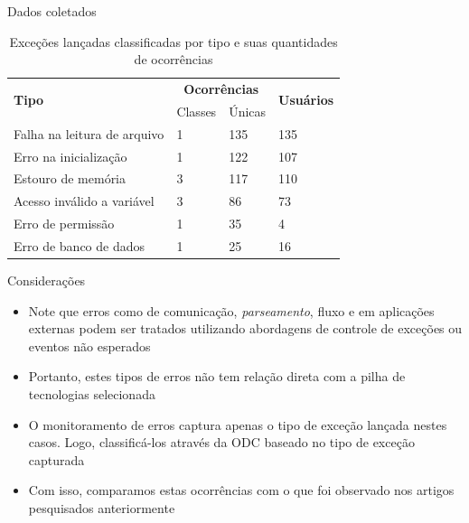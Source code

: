 \documentclass[brazilian]{beamer}
\begin{document}
\begin{frame}{Dados coletados}
    \begin{table}[H]
        \centering
        \begin{tabularx}{\textwidth}{ l|X|l|l }
            \multirow{2}{*}{\textbf{Tipo}} & \multicolumn{2}{c|}{\textbf{Ocorrências}} & \multirow{2}{*}{\textbf{Usuários}} \\
            & Classes & Únicas & \\
            \hline
            Falha na leitura de arquivo & 1 & 135 & 135 \\
            Erro na inicialização & 1 & 122 & 107 \\
            Estouro de memória & 3 & 117 & 110 \\
            Acesso inválido a variável & 3 & 86 & 73 \\
            Erro de permissão & 1 & 35 & 4 \\
            Erro de banco de dados & 1 & 25 & 16 \\
        \end{tabularx}
        \caption{Exceções lançadas classificadas por tipo e suas quantidades de ocorrências}
        \label{table:exceptions_classification_2}
    \end{table}
\end{frame}

\begin{frame}{Considerações}
    \begin{itemize}
        \item Note que erros como de comunicação, \textit{parseamento}, fluxo e em aplicações externas podem ser tratados utilizando abordagens de controle de exceções ou eventos não esperados
        \item Portanto, estes tipos de erros não tem relação direta com a pilha de tecnologias selecionada
        \item O monitoramento de erros captura apenas o tipo de exceção lançada nestes casos. Logo, classificá-los através da ODC baseado no tipo de exceção capturada
        \item Com isso, comparamos estas ocorrências com o que foi observado nos artigos pesquisados anteriormente
    \end{itemize}
\end{frame}
\end{document}
